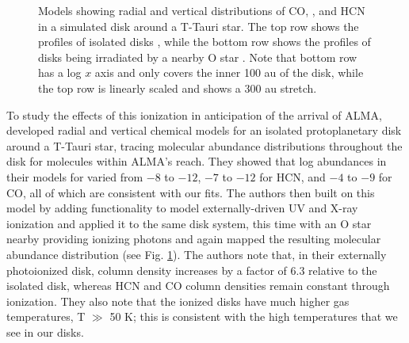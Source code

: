 \begin{figure}[t]
  \hspace*{\fill}%
  \vfill%
  \hspace*{\fill}%
  \caption{Models showing radial and vertical distributions of CO, \hco, and HCN in a simulated disk around a T-Tauri star. The top row shows the profiles of isolated disks \citep{Walsh2010}, while the bottom row shows the profiles of disks being irradiated by a nearby O star \citep{Walsh2013}. Note that bottom row has a log $x$ axis and only covers the inner 100 au of the disk, while the top row is linearly scaled and shows a 300 au stretch.}
  \label{fig:walsh-abundance-profs}
\end{figure}




To study the effects of this ionization in anticipation of the arrival of ALMA, \citet{Walsh2010} developed radial and vertical chemical models for an isolated protoplanetary disk around a T-Tauri star, tracing molecular abundance distributions throughout the disk for molecules within ALMA's reach. They showed that log abundances in their models for \hco{} varied from $-8$ to $-12$, $-7$ to $-12$ for HCN, and $-4$ to $-9$ for CO, all of which are consistent with our fits. The authors then built on this model by adding functionality to model externally-driven UV and X-ray ionization \citep{Walsh2012} and applied it to the same disk system, this time with an O star nearby providing ionizing photons \citep{Walsh2013} and again mapped the resulting molecular abundance distribution (see Fig. \ref{fig:walsh-abundance-profs}). The authors note that, in their externally photoionized disk, \hco{} column density increases by a factor of 6.3 relative to the isolated disk, whereas HCN and CO column densities remain constant through ionization. They also note that the ionized disks have much higher gas temperatures, T $\gg$ 50 K; this is consistent with the high temperatures that we see in our disks.


